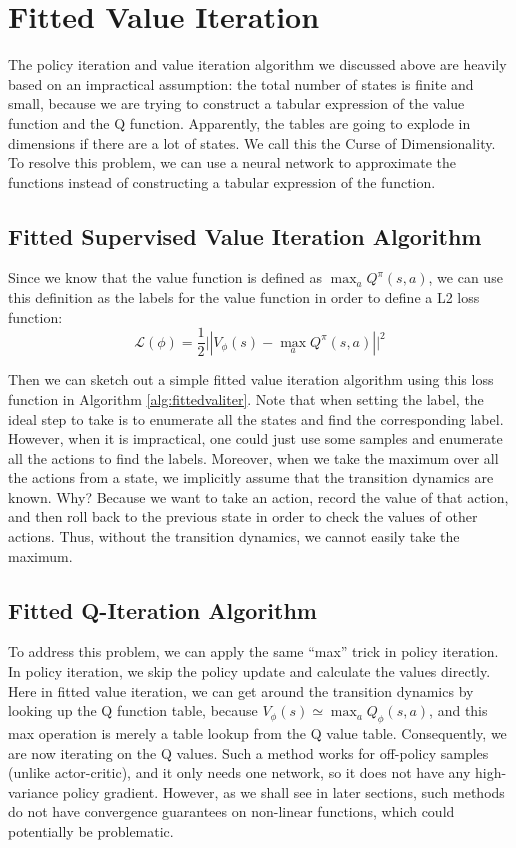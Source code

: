 \section{Fitted Value Iteration}
The policy iteration and value iteration algorithm we discussed above are heavily based on an impractical assumption: the total number of states is finite and small, because we are trying to construct a tabular expression of the value function and the Q function. Apparently, the tables are going to explode in dimensions if there are a lot of states. We call this the Curse of Dimensionality. To resolve this problem, we can use a neural network to approximate the functions instead of constructing a tabular expression of the function. 

\subsection{Fitted Supervised Value Iteration Algorithm}
Since we know that the value function is defined as $\max_a Q^\pi(s,a)$, we can use this definition as the labels for the value function in order to define a L2 loss function:
$$\mathcal{L}(\phi) = \frac{1}{2}\lvert|V_\phi(s) - \max_{a}Q^\pi(s,a)|\rvert^2$$

Then we can sketch out a simple fitted value iteration algorithm using this loss function in Algorithm \ref{alg:fittedvaliter}. Note that when setting the label, the ideal step to take is to enumerate all the states and find the corresponding label. However, when it is impractical, one could just use some samples and enumerate all the actions to find the labels. Moreover, when we take the maximum over all the actions from a state, we implicitly assume that the transition dynamics are known. Why? Because we want to take an action, record the value of that action, and then roll back to the previous state in order to check the values of other actions. Thus, without the transition dynamics, we cannot easily take the maximum.
\subsection{Fitted Q-Iteration Algorithm}
To address this problem, we can apply the same ``max'' trick in policy iteration. In policy iteration, we skip the policy update and calculate the values directly. Here in fitted value iteration, we can get around the transition dynamics by looking up the Q function table, because $V_\phi(s) \simeq \max_{a}Q_\phi(s,a)$, and this max operation is merely a table lookup from the Q value table. Consequently, we are now iterating on the Q values. Such a method works for off-policy samples (unlike actor-critic), and it only needs one network, so it does not have any high-variance policy gradient. However, as we shall see in later sections, such methods do not have convergence guarantees on non-linear functions, which could potentially be problematic.

